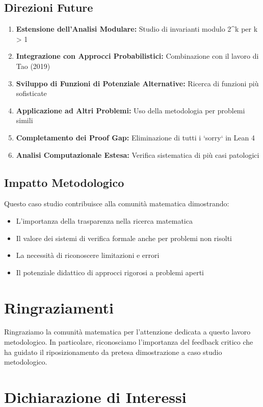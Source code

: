 \documentclass[11pt,a4paper]{article}
\begin{document}
\subsection{Direzioni Future}

\begin{enumerate}
\item \textbf{Estensione dell'Analisi Modulare:} Studio di invarianti modulo 2^k per k > 1
\item \textbf{Integrazione con Approcci Probabilistici:} Combinazione con il lavoro di Tao (2019)
\item \textbf{Sviluppo di Funzioni di Potenziale Alternative:} Ricerca di funzioni più sofisticate
\item \textbf{Applicazione ad Altri Problemi:} Uso della metodologia per problemi simili
\item \textbf{Completamento dei Proof Gap:} Eliminazione di tutti i `sorry` in Lean 4
\item \textbf{Analisi Computazionale Estesa:} Verifica sistematica di più casi patologici
\end{enumerate}

\subsection{Impatto Metodologico}

Questo caso studio contribuisce alla comunità matematica dimostrando:
\begin{itemize}
\item L'importanza della trasparenza nella ricerca matematica
\item Il valore dei sistemi di verifica formale anche per problemi non risolti
\item La necessità di riconoscere limitazioni e errori
\item Il potenziale didattico di approcci rigorosi a problemi aperti
\end{itemize}

\section*{Ringraziamenti}

Ringraziamo la comunità matematica per l'attenzione dedicata a questo lavoro metodologico. In particolare, riconosciamo l'importanza del feedback critico che ha guidato il riposizionamento da pretesa dimostrazione a caso studio metodologico.

\section*{Dichiarazione di Interessi}
\end{document}
